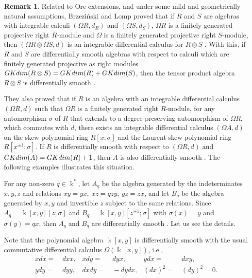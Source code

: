 \documentclass{amsart}
\theoremstyle{definition}
\newtheorem{remark}[theorem]{Remark}
\theoremstyle{remark}
\numberwithin{equation}{section}
\begin{document}
\begin{remark}\label{Brzezinski2015ExamplesOE}
Related to Ore extensions, and under some mild and geometrically natural assumptions, Brzezi\'nski and Lomp proved that if $R$ and $S$ are algebras with integrable calculi $(\Omega R, d_R)$ and $(\Omega S, d_S)$, $\Omega R$ is a finitely generated projective right $R$-module and $\Omega$ is a finitely generated projective right $S$-module, then $(\Omega R \otimes \Omega S, d)$ is an integrable differential calculus for $R\otimes S$ \cite[Proposition 3.1]{BrzezinskiLomp2018}. With this, if $R$ and $S$ are differentially smooth algebras with respect to calculi which are finitely generated projective as right modules ${\rm GKdim}(R \otimes S) = {\rm GKdim}(R) + {\rm GKdim}(S)$, then the tensor product algebra $R\otimes S$ is differentially smooth \cite[Corollary 3.2]{BrzezinskiLomp2018}.

They also proved that if $R$ is an algebra with an integrable differential calculus $(\Omega R, d)$ such that $\Omega R$ is a finitely generated right $R$-module, for any automorphism $\sigma$ of $R$ that extends to a degree-preserving automorphism of $\Omega R$, which commutes with $d$, there exists an integrable differential calculus $(\Omega A, d)$ on the skew polynomial ring $R[x;\sigma]$ and the Laurent skew polynomial ring $R[x^{\pm 1}; \sigma]$. If $R$ is differentially smooth with respect to $(\Omega R, d)$ and ${\rm GKdim}(A) = {\rm GKdim}(R) + 1$, then $A$ is also differentially smooth \cite[Theorem 4.1]{BrzezinskiLomp2018}. The following examples illustrates this situation.

For any non-zero $q\in \Bbbk^{*}$, let $A_q$ be the algebra generated by the indeterminates $x, y, z$ and relations $xy = yx,\ xz = qzy, \ yz = zx$, and let $B_q$ be the algebra generated by $x, y$ and invertible $z$ subject to the same relations. Since $A_q = \Bbbk[x, y][z;\sigma]$ and $B_q = \Bbbk[x, y][z^{\pm 1};\sigma]$ with $\sigma(x) = y$ and $\sigma(y) = qx$, then $A_q$ and $B_q$ are differentially smooth \cite[Example 4.6]{BrzezinskiLomp2018}. Let us see the details.

Note that the polynomial algebra $\Bbbk[x, y]$ is differentially smooth with the usual commutative differential calculus $\Omega (\Bbbk[x, y])$, i.e.,
\begin{align*}
       x dx = &\ dx x, & x dy = &\ dy x, & y dx = &\ dx y, \\ 
       y dy = &\ dy y, & dx dy = &\ - dy dx, & (dx)^2 = &\ (dy)^2 = 0. 
\end{align*}


\end{remark}
\end{document}
